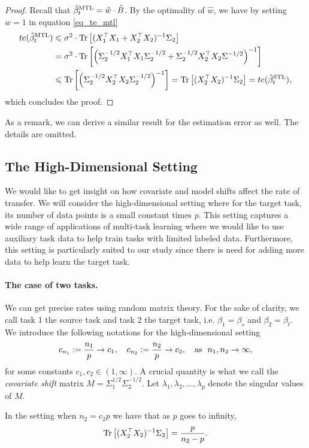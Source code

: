 \begin{proof}
	Recall that $\hat{\beta}_t^{\text{MTL}} = \hat{w} \cdot \hat{B}$.
	By the optimality of $\hat{w}$, we have by setting $w = 1$ in equation \eqref{eq_te_mtl}
	\begin{align*}
		te(\hat{\beta}_t^{\text{MTL}}) &\leqslant \sigma^2 \cdot \operatorname{Tr}\left[(X_1^{\top}X_1 + X_2^{\top}X_2)^{-1}\Sigma_2\right] \\
		&= \sigma^2 \cdot \operatorname{Tr}\left[\left({\Sigma_2^{-1/2}X_1^{\top}X_1\Sigma_2^{-1/2} + \Sigma_2^{-1/2}X_2^{\top}X_2\Sigma^{-1/2}}\right)^{-1}\right] \\
		&\leqslant \operatorname{Tr}\left[\left({\Sigma_2^{-1/2}X_2^{\top}X_2\Sigma_2^{-1/2}}\right)^{-1}\right]
			= \operatorname{Tr}\left[(X_2^{\top}X_2)^{-1} \Sigma_2\right] = te(\hat{\beta}_t^{\text{STL}}),
	\end{align*}
	which concludes the proof.
\end{proof}

As a remark, we can derive a similar result for the estimation error as well. The details are omitted.


\subsection{The High-Dimensional Setting}

We would like to get insight on how covariate and model shifts affect the rate of transfer.
We will consider the high-dimensional setting where for the target task, its number of data points is a small constant times $p$.
This setting captures a wide range of applications of multi-task learning where we would like to use auxiliary task data to help train tasks with limited labeled data.
Furthermore, this setting is particularly suited to our study since there is need for adding more data to help learn the target task.

\paragraph{The case of two tasks.}
We can get precise rates using random matrix theory.
For the sake of clarity, we call task 1 the source task and task 2 the target task,
i.e. $\beta_1 = \beta_s$ and $\beta_2 = \beta_t$.
We introduce the following notations for the high-dimensional setting
\[ c_{n_1} := \frac{n_1}{p} \to c_1, \quad c_{n_2} := \frac{n_2}p \to c_2, \quad \text{as } \ n_1, n_2\to \infty, \]
for some constants $c_1, c_2 \in (1,\infty)$.
A crucial quantity is what we call the \textit{covariate shift} matrix $M = \Sigma_1^{1/2}\Sigma_2^{-1/2}$.
Let $\lambda_1, \lambda_2, \dots, \lambda_p$ denote the singular values of $M$.

\begin{lemma}\label{lem_minv}
	In the setting when $n_2 = c_2 p$ we have that as $p$ goes to infinity,
	\[ \operatorname{Tr}\left[(X_2^{\top}X_2)^{-1}\Sigma_2\right] = \frac{p}{n_2 - p}. \]
\end{lemma}